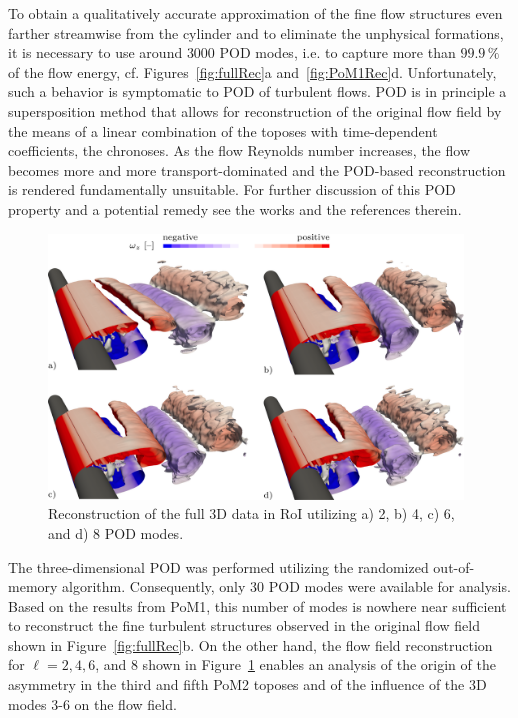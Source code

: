 {{{{To obtain a qualitatively accurate approximation of the fine flow structures even farther streamwise from the cylinder and to eliminate the unphysical formations, it is necessary to use around $3000$ POD modes, i.e. to capture more than $99.9\,\%$ of the flow energy, cf. Figures~\ref{fig:fullRec}a and~\ref{fig:PoM1Rec}d. Unfortunately, such a behavior is symptomatic to POD of turbulent flows. POD is in principle a supersposition method that allows for reconstruction of the original flow field by the means of a linear combination of the toposes with time-dependent coefficients, the chronoses. As the flow Reynolds number increases, the flow becomes more and more transport-dominated and the POD-based reconstruction is rendered fundamentally unsuitable. For further discussion of this POD property and a potential remedy see the works \citep{reiss2018,reiss2021} and the references therein.


\begin{figure}[htbp]
    \centering
    \includegraphics[width=0.98\textwidth]{02_images/00_export/figure25.png}
    \caption{Reconstruction of the full 3D data in RoI utilizing a) 2, b) 4, c) 6, and d) 8 POD modes.}
    \label{fig:RoIRec}
\end{figure}
The three-dimensional POD was performed utilizing the randomized out-of-memory algorithm. Consequently, only 30 POD modes were available for analysis. Based on the results from PoM1, this number of modes is nowhere near sufficient to reconstruct the fine turbulent structures observed in the original flow field shown in Figure~\ref{fig:fullRec}b. On the other hand, the flow field reconstruction for $\ell = 2,4,6$, and $8$ shown in Figure~\ref{fig:RoIRec} enables an analysis of the origin of the asymmetry in the third and fifth PoM2 toposes and of the influence of the 3D modes $3$-$6$ on the flow field.

}}}}
